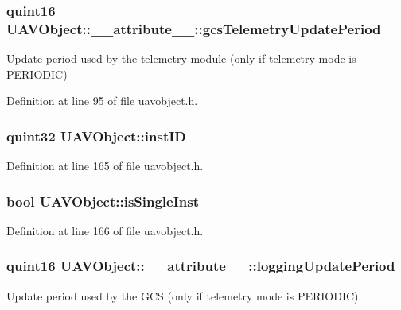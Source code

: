 \hypertarget{group___u_a_v_objects_plugin_ga3698244bb0c29537b3d26442624ee03b}{
\subsubsection[{gcs\-Telemetry\-Update\-Period}]{\setlength{\rightskip}{0pt plus 5cm}quint16 U\-A\-V\-Object\-::\-\_\-\-\_\-attribute\-\_\-\-\_\-\-::gcs\-Telemetry\-Update\-Period}}\label{group___u_a_v_objects_plugin_ga3698244bb0c29537b3d26442624ee03b}
Update period used by the telemetry module (only if telemetry mode is P\-E\-R\-I\-O\-D\-I\-C) 

Definition at line 95 of file uavobject.\-h.

\hypertarget{group___u_a_v_objects_plugin_gad8d656542a04e9fbef607ff178f6d9d3}{
\subsubsection[{inst\-I\-D}]{\setlength{\rightskip}{0pt plus 5cm}quint32 U\-A\-V\-Object\-::inst\-I\-D\hspace{0.3cm}{\ttfamily [protected]}}}\label{group___u_a_v_objects_plugin_gad8d656542a04e9fbef607ff178f6d9d3}


Definition at line 165 of file uavobject.\-h.

\hypertarget{group___u_a_v_objects_plugin_gaa279cad3a000cc930e7f386672426bcb}{
\subsubsection[{is\-Single\-Inst}]{\setlength{\rightskip}{0pt plus 5cm}bool U\-A\-V\-Object\-::is\-Single\-Inst\hspace{0.3cm}{\ttfamily [protected]}}}\label{group___u_a_v_objects_plugin_gaa279cad3a000cc930e7f386672426bcb}


Definition at line 166 of file uavobject.\-h.

\hypertarget{group___u_a_v_objects_plugin_gad4c54f8af5beeb9dc2bbe402c9f01299}{
\subsubsection[{logging\-Update\-Period}]{\setlength{\rightskip}{0pt plus 5cm}quint16 U\-A\-V\-Object\-::\-\_\-\-\_\-attribute\-\_\-\-\_\-\-::logging\-Update\-Period}}\label{group___u_a_v_objects_plugin_gad4c54f8af5beeb9dc2bbe402c9f01299}
Update period used by the G\-C\-S (only if telemetry mode is P\-E\-R\-I\-O\-D\-I\-C) 

